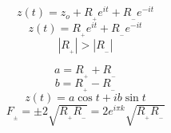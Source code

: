 \documentclass[preview]{standalone}
\begin{document}
\begin{center}
$$z(t)=z_o+ R_{_+} e^{it} +R_{_-} e^{-it}$$ 
$$z(t)=R_{_+} e^{it} +R_{_-} e^{-it}$$
$$|R_{_+}|>|R_{_-}|$$  

$$a=R_{_+}+R_{_-}$$ 
$$b=R_{_+}-R_{_-}$$
$$z(t)=a\cos{t}+i b \sin{t}$$ 
$$F_{_{\pm}}=\pm 2\sqrt{R_{_+}R_{_-}}=2 e^{i\pi k} \sqrt{R_{_+}R_{_-}}$$
\end{center}
\end{document}
